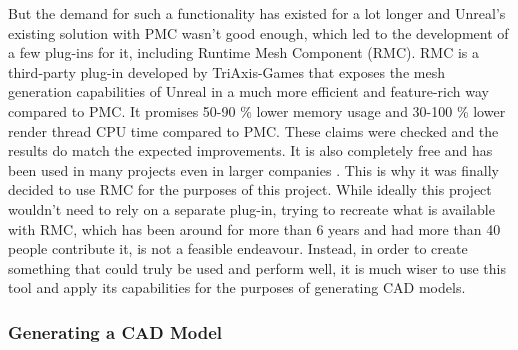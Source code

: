 But the demand for such a functionality has existed for a lot longer and Unreal's existing solution with \acs{PMC} wasn't good enough, which led to the development of a few plug-ins for it, including Runtime Mesh Component (\acs{RMC}). \acs{RMC} is a third-party plug-in developed by TriAxis-Games that exposes the mesh generation capabilities of Unreal in a much more efficient and feature-rich way compared to \acs{PMC}\cite{bib:RMC}. It promises 50-90 \% lower memory usage and 30-100 \% lower render thread CPU time \cite{} compared to \acs{PMC}. These claims were checked and the results do match the expected improvements. It is also completely free and has been used in many projects even in larger companies \cite{bib:RMC}. This is why it was finally decided to use \acs{RMC} for the purposes of this project. While ideally this project wouldn't need to rely on a separate plug-in, trying to recreate what is available with \acs{RMC}, which has been around for more than 6 years and had more than 40 people contribute it, is not a feasible endeavour. Instead, in order to create something that could truly be used and perform well, it is much wiser to use this tool and apply its capabilities for the purposes of generating \acs{CAD} models.

\subsubsection{Generating a CAD Model}

